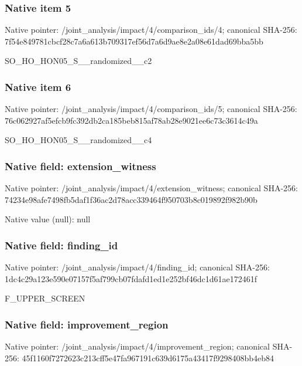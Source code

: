 \documentclass[10pt,a4paper]{article}
\begin{document}
\subsubsection{Native item 5}
Native pointer: /joint\_\allowbreak{}analysis/impact/4/comparison\_\allowbreak{}ids/4; canonical SHA-256: 7f54e849781cbcf28c7a6a613b709317ef56d7a6d9ae8e2a08e61dad69bba5bb

\begingroup\raggedright\sloppy SO\_\allowbreak{}HO\_\allowbreak{}HON05\_\allowbreak{}S\_\allowbreak{}\_\allowbreak{}randomized\_\allowbreak{}\_\allowbreak{}c2\par\endgroup

\subsubsection{Native item 6}
Native pointer: /joint\_\allowbreak{}analysis/impact/4/comparison\_\allowbreak{}ids/5; canonical SHA-256: 76c062927af5efcb9fc392db2ca185beb815af78ab28e9021ee6c73c3614c49a

\begingroup\raggedright\sloppy SO\_\allowbreak{}HO\_\allowbreak{}HON05\_\allowbreak{}S\_\allowbreak{}\_\allowbreak{}randomized\_\allowbreak{}\_\allowbreak{}c4\par\endgroup

\subsubsection{Native field: extension\_\allowbreak{}witness}
Native pointer: /joint\_\allowbreak{}analysis/impact/4/extension\_\allowbreak{}witness; canonical SHA-256: 74234e98afe7498fb5daf1f36ac2d78acc339464f950703b8c019892f982b90b

Native value (null): null

\subsubsection{Native field: finding\_\allowbreak{}id}
Native pointer: /joint\_\allowbreak{}analysis/impact/4/finding\_\allowbreak{}id; canonical SHA-256: 1dc4c29a123e590e07157f5af799cb07fdafd1ed1e252bf46dc1d61ae172461f

\begingroup\raggedright\sloppy F\_\allowbreak{}UPPER\_\allowbreak{}SCREEN\par\endgroup

\subsubsection{Native field: improvement\_\allowbreak{}region}
Native pointer: /joint\_\allowbreak{}analysis/impact/4/improvement\_\allowbreak{}region; canonical SHA-256: 45f1160f7272623c213cff5e47fa967191c639d6175a43417f9298408bb4eb84
\end{document}

